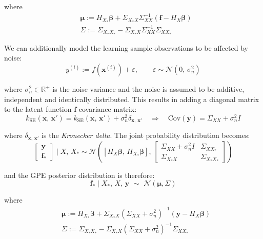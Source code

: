 \noindent
where
%
\begin{align}
    &\boldsymbol{\mu} := H_{X_{*}}\boldsymbol{\beta} + \Sigma_{X_{*}X}\Sigma_{XX}^{-1}(\mathbf{f} - H_{X}\boldsymbol{\beta}) \\
    &\Sigma := \Sigma_{X_{*}X_{*}}-\Sigma_{X_{*}X}\Sigma_{XX}^{-1}\Sigma_{XX_{*}}
\end{align}

We can additionally model the learning sample observations to be affected by noise:
\begin{equation}
    y^{(i)}:=f(\mathbf{x}^{(i)}) + \varepsilon,\qquad \varepsilon\sim\mathcal{N}(0,\,\sigma_n^2)
\end{equation}

\noindent
where $\sigma_n^2\in\mathbb{R}^{+}$ is the noise variance and the noise is assumed to be additive, independent and identically distributed. This results in adding a diagonal matrix to the latent function $\mathbf{f}$ covariance matrix:
\begin{equation}
    k_{\text{SE}}(\mathbf{x},\,\mathbf{x}') = k_{\text{SE}}(\mathbf{x},\,\mathbf{x}') + \sigma_n^2\delta_{\mathbf{x},\,\mathbf{x}'} \quad\Rightarrow\quad \text{Cov}(\mathbf{y})=\Sigma_{XX}+\sigma_n^2 I
\end{equation}

\noindent
where $\delta_{\mathbf{x},\,\mathbf{x}'}$ is the \textit{Kronecker delta}. The joint probability distribution becomes:
\begin{equation}
    \begin{bmatrix}
    \mathbf{y} \\ \mathbf{f}_{*}
    \end{bmatrix}\;\vert\; X,\,X_{*} \sim \mathcal{N}\left([H_{X}\boldsymbol{\beta},\,H_{X_{*}}\boldsymbol{\beta}],\,\begin{bmatrix}
    \Sigma_{XX}+\sigma_n^2 I & \Sigma_{XX_{*}} \\
    \Sigma_{X_{*}X} & \Sigma_{X_{*}X_{*}}
    \end{bmatrix}
    \right)
\end{equation}

\noindent
and the GPE posterior distribution is therefore:
\begin{equation}\label{eq:gpepostdistr}
    \mathbf{f}_{*}\;\vert\; X_{*},\,X,\,\mathbf{y}\,\,\sim\,\,\mathcal{N}(\boldsymbol{\mu},\Sigma)
\end{equation}
    
\noindent
where
%
\begin{align}
    &\boldsymbol{\mu} := H_{X_{*}}\boldsymbol{\beta} + \Sigma_{X_{*}X}(\Sigma_{XX}+\sigma_n^2)^{-1}(\mathbf{y} - H_{X}\boldsymbol{\beta}) \\
    &\Sigma := \Sigma_{X_{*}X_{*}}-\Sigma_{X_{*}X}(\Sigma_{XX}+\sigma_n^2)^{-1}\Sigma_{XX_{*}}
\end{align}

